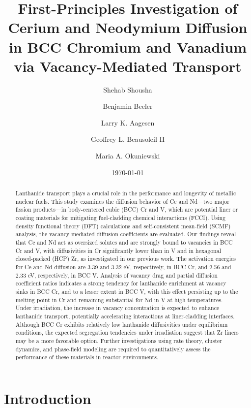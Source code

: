 \documentclass[preprint,12pt]{elsarticle}
\title{First-Principles Investigation of Cerium and Neodymium Diffusion in BCC Chromium and Vanadium via Vacancy-Mediated Transport}
\author[inst1]{Shehab Shousha}
\affiliation[inst1]{organization={North Carolina State University},%
            city={Raleigh}, 
            state={NC},
             postcode={27695},
            country={United States}}
\author[inst1,inst2]{Benjamin Beeler}
\affiliation[inst2]{organization={Idaho National Laboratory},%
            city={Idaho Falls}, 
            state={ID},
            postcode={83415},
            country={United States}}
\author[inst2,inst3]{Larry K. Aagesen}
\affiliation[inst3]{organization={Department of Nuclear Engineering and Radiological Sciences, University of Michigan},%
            city={Ann Arbor}, 
            state={MI},
            postcode={48109},
            country={United States}}
\author[inst2]{Geoffrey L. Beausoleil II}
\author[inst4]{Maria A. Okuniewski}
\affiliation[inst4]{organization={Purdue University},%
            city={West Lafayette},
            state={IN},
            postcode={47907}, 
            country={United States}}
\date{\today}
\begin{document}
\begin{abstract}
Lanthanide transport plays a crucial role in the performance and longevity of metallic nuclear fuels. This study examines the diffusion behavior of Ce and Nd—two major fission products—in body-centered cubic (BCC) Cr and V, which are potential liner or coating materials for mitigating fuel-cladding chemical interactions (FCCI). Using density functional theory (DFT) calculations and self-consistent mean-field (SCMF) analysis, the vacancy-mediated diffusion coefficients are evaluated. Our findings reveal that Ce and Nd act as oversized solutes and are strongly bound to vacancies in BCC Cr and V, with diffusivities in Cr significantly lower than in V and in hexagonal closed-packed (HCP) Zr, as investigated in our previous work. The activation energies for Ce and Nd diffusion are 3.39 and 3.32 eV, respectively, in BCC Cr, and 2.56 and 2.33 eV, respectively, in BCC V. Analysis of vacancy drag and partial diffusion coefficient ratios indicates a strong tendency for lanthanide enrichment at vacancy sinks in BCC Cr, and to a lesser extent in BCC V, with this effect persisting up to the melting point in Cr and remaining substantial for Nd in V at high temperatures. Under irradiation, the increase in vacancy concentration is expected to enhance lanthanide transport, potentially accelerating interactions at liner-cladding interfaces. Although BCC Cr exhibits relatively low lanthanide diffusivities under equilibrium conditions, the expected segregation tendencies under irradiation suggest that Zr liners may be a more favorable option. Further investigations using rate theory, cluster dynamics, and phase-field modeling are required to quantitatively assess the performance of these materials in reactor environments.

\end{abstract}

\maketitle

\section{Introduction}
\end{document}
